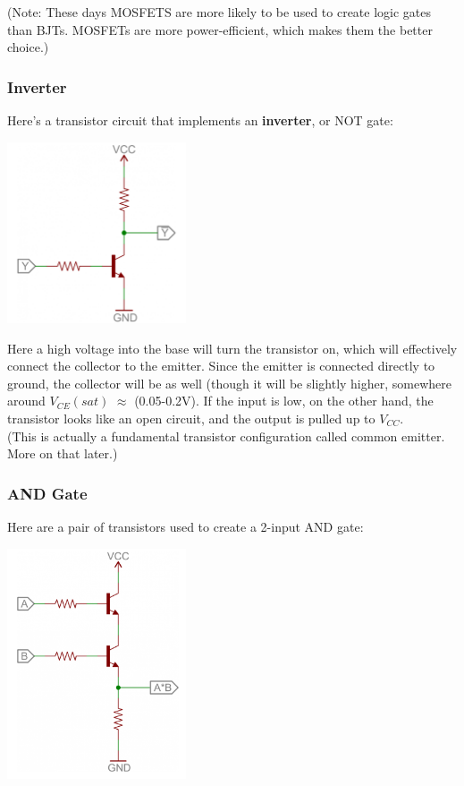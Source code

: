 \documentclass[a4paper, 11pt]{article} %
\begin{document}
(Note: These days MOSFETS are more likely to be used to create logic gates than BJTs. MOSFETs are more power-efficient, which makes them the better choice.)\\

\subsubsection*{Inverter}

Here’s a transistor circuit that implements an \textbf{inverter}, or NOT gate:

\begin{center}
\includegraphics[width=150pt]{tran17}
\end{center}

Here a high voltage into the base will turn the transistor on, which will effectively connect the collector to the emitter. Since the emitter is connected directly to ground, the collector will be as well (though it will be slightly higher, somewhere around $V_{CE}(sat)$ $\approx$ (0.05-0.2V). If the input is low, on the other hand, the transistor looks like an open circuit, and the output is pulled up to $V_{CC}$.\\

(This is actually a fundamental transistor configuration called common emitter. More on that later.)\\

\subsubsection*{AND Gate}

Here are a pair of transistors used to create a 2-input AND gate:

\begin{center}
\includegraphics[width=150pt]{tran18}
\end{center}
\end{document}
